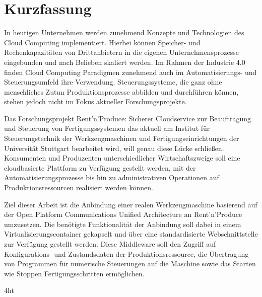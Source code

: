 \documentclass[
a4paper,
twoside,
headsepline,
cleardoublepage=empty,
parskip=half,
draft=false
]{scrbook}
\begin{document}
	\newpage

	\section*{Kurzfassung}

		In heutigen Unternehmen werden zunehmend Konzepte und Technologien des Cloud Computing implementiert. 
		Hierbei können Speicher- und Rechenkapazitäten von Drittanbietern in die eigenen Unternehmensprozesse eingebunden und nach Belieben skaliert werden. 
		Im Rahmen der Industrie 4.0 finden Cloud Computing Paradigmen zunehmend auch im Automatisierungs- und Steuerungsumfeld ihre Verwendung. Steuerungssysteme, die ganz ohne menschliches Zutun Produktionsprozesse abbilden und durchführen können, stehen jedoch nicht im Fokus aktueller Forschungsprojekte.

		Das Forschungsprojekt \glqq Rent'n'Produce: Sicherer Cloudservice zur Beauftragung und Steuerung von Fertigungssystemen\grqq{} das aktuell am Institut für Steuerungstechnik der Werkzeugmaschinen und Fertigungseinrichtungen der Universität Stuttgart bearbeitet wird, will genau diese Lücke schließen.
		Konsumenten und Produzenten unterschiedlicher Wirtschaftszweige soll eine cloudbasierte Plattform zu Verfügung gestellt werden, mit der Automatisierungsprozesse bis hin zu administrativen Operationen auf Produktionsressourcen realisiert werden können.

		Ziel dieser Arbeit ist die Anbindung einer realen Werkzeugmaschine basierend auf der Open Platform Communications Unified Architecture an Rent'n'Produce umzusetzen.
		Die benötigte Funktionalität der Anbindung soll dabei in einem Virtualisierungscontainer gekapselt und über eine standardisierte Webschnittstelle zur Verfügung gestellt werden.
		Diese Middleware soll den Zugriff auf Konfigurations- und Zustandsdaten der Produktionsressource, die Übertragung von Programmen für numerische Steuerungen auf die Maschine sowie das Starten wie Stoppen Fertigungsschritten ermöglichen.

	\cleardoublepage


	\iftex4ht
	\else
	\fi


	\tableofcontents
\end{document}
